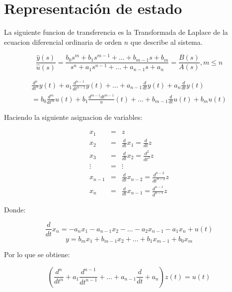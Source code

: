 
\chapter{Representación de estado}

    La siguiente funcion de transferencia es la Transformada de Laplace de la ecuacion diferencial ordinaria de orden $n$ que describe al sistema.

    \begin{equation}
        \frac{\hat{y}(s)}{\hat{u}(s)} = \frac{b_0 s^m + b_1 s^{m-1} + ... + b_{m-1} s + b_m}{s^n + a_1 s^{n-1} + ... + a_{n-1} s + a_n} = \frac{B(s)}{A(s)}, m \le n
    \end{equation}

    \begin{multline}
        \frac{d^n}{dt^n} y(t) + a_1 \frac{d^{n-1}}{dt^{n-1}} y(t) + \dots + a_{n-1} \frac{d}{dt} y(t) + a_n \frac{d}{dt} y(t) \\ = b_0 \frac{d^m}{dt^m} u(t) + b_1 \frac{d^{m-1}{dt^{m-1}}} u(t) + \dots + b_{m-1} \frac{d}{dt} u(t) + b_{m} u(t)
    \end{multline}

    Haciendo la siguiente asignacion de variables:

    \begin{eqnarray}
    x_1     & = & z \nonumber \\
    x_2     & = & \frac{d}{dt} x_1 = \frac{d}{dt} z \nonumber \\
    x_3     & = & \frac{d}{dt} x_2 = \frac{d^2}{dt^2} z \nonumber \\
    \vdots  & = & \vdots \nonumber \\
    x_{n-1} & = & \frac{d}{dt} x_{n-2} = \frac{d^{n-2}}{dt^{n-2}} z \nonumber \\
    x_n     & = & \frac{d}{dt} x_{n-1} = \frac{d^{n-1}}{d^{n-1}} z \nonumber
    \end{eqnarray}

    Donde:

    \begin{equation}
        \frac{d}{dt} x_n = -a_n x_1 - a_{n-1} x_2 - \dots - a_2 x_{n-1} - a_1 x_n + u(t)
    \end{equation}
    \begin{equation}
        y = b_m x_1 + b_{m-1} x_2 + \dots + b_1 x_{m-1} + b_0 x_m
    \end{equation}

    Por lo que se obtiene:

    \begin{equation*}
        \left( \frac{d^n}{dt^n} + a_1 \frac{d^{n-1}}{dt^{n-1}} + \dots + a_{n-1} \frac{d}{dt} + a_n \right) z(t) = u(t)
    \end{equation*}

